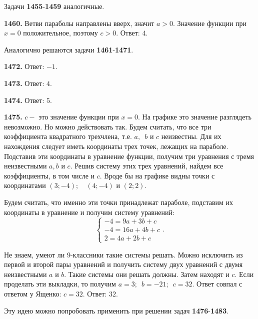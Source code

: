 Задачи \textbf{1455}-\textbf{1459} аналогичные.

\textbf{1460.} Ветви параболы направлены вверх, значит $a>0$. Значение функции при $x=0$ положительное, поэтому $c>0$. \newline \null \hspace*{\fill} Ответ: $4$. 

Аналогично решаются задачи  \textbf{1461}-\textbf{1471}.

\textbf{1472.} \newline \null \hspace*{\fill} Ответ: $-1$.

\textbf{1473.} \newline \null \hspace*{\fill} Ответ: $4$.

\textbf{1474.} \newline \null \hspace*{\fill} Ответ: $5$.

\textbf{1475.} $c-$ это значение функции при $x=0$. На графике это значение разглядеть невозможно. Но можно действовать так. Будем считать, что все три коэффициента квадратного трехчлена, т.е. $a,\enspace b$ и $c$ неизвестны. Для их нахождения следует иметь координаты  трех точек, лежащих на параболе. Подставив эти координаты в уравнение функции, получим три уравнения с тремя неизвестными $a,b$ и $c$. Решив систему этих трех уравнений, найдем все коэффициенты, в том числе и $c$. Вроде бы на графике видны точки с координатами $(3;-4);\quad (4;-4)$ и $(2;2)$.

Будем считать, что именно эти точки принадлежат параболе, подставим их координаты в уравнение и получим систему уравнений:$$
	\begin{cases}
		-4=9a+3b+c
		\\
		-4=16a+4b+c
		\\
		2=4a+2b+c
	\end{cases}
	.$$

Не знаем, умеют ли 9-классники такие системы решать. Можно исключить 
из первой и второй пары уравнений и получить систему двух уравнений с двумя неизвестными $a$ и $b$. Такие системы они решать должны. Затем находят и $c$. Если проделать эти выкладки, то получим $a=3;\enspace b=-21;\enspace c=32$.  Ответ совпал с ответом у Ященко: $c=32$. \newline \null \hspace*{\fill} Ответ: $32$.

Эту идею можно попробовать применить при решении задач  \textbf{1476}-\textbf{1483}.

